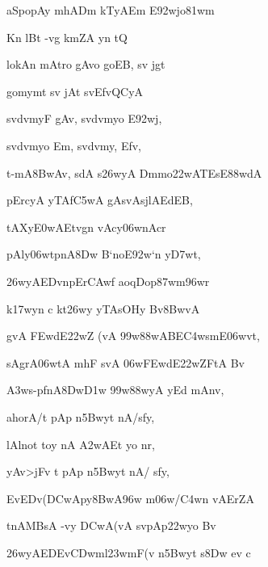 {\dn aSpopAy\2 mhADm{\rdt} kTyAEm E\392wjo\381wm{\dandadn} \dontdisplaylinenum}

{\dn {}K\?n lBt\? -vg{\rdt} km\0ZA y\?n tQ \vegdn\dontdisplaylinenum}

{\dn lokAn\2 mAtro gAvo goEB, sv{\rdt} jgt \dontdisplaylinenum}

{\dn gomymt\2 sv{\rdt} jAt\2 sv\0Efv\?QCyA \vegdn\dontdisplaylinenum}

{\dn sv\0d\?vmyF gAv, sv\0d\?vmyo E\392wj,{\dandabdn} \dontdisplaylinenum}

{\dn sv\0d\?vmyo Em, sv\0d\?vmy, Efv, \vegdn\dontdisplaylinenum}

{\dn t-mA\38BwAv, sdA s\?\326wyA Dm\0mo\322wAT\0EsE\388wdA{\dandabdn} \dontdisplaylinenum}

{\dn pErcyA\0 yTAf\3C5wA g\5AsvAsjlAEdEB, \vegdn\dontdisplaylinenum}

{\dn tAXy\?\3E0wAEtv\?g\?n vAcy\?\306wnAcr\? \dontdisplaylinenum}

{\dn pAly\306wtp\0nA\38Dw\? B`noE\392w`n\? y\3D7wt, \vegdn\dontdisplaylinenum}

{\dn \326wyAEDvnpEr\3CAw\?f aoqDop\387wm\396wr\? \dontdisplaylinenum}

{\dn k\317wyn\2 c kt\0\326wy\2 yTAsOHy\2 Bv\?\38BwvA \vegdn\dontdisplaylinenum}

{\dn gvA\2 \3FEwdE\322wZ\2 (vA \399w\388wABE\3C4wsmE\306wvt,{\dandabdn} \dontdisplaylinenum}

{\dn sAgrA\306wtA mhF svA\0 \306w\3FEwdE\322wZFtA Bv\? \vegdn\dontdisplaylinenum}

{\dn {}\3A3ws\2-pf\0nA\38Dw\3D1w \399w\388wyA yEd mAnv,{\dandabdn} \dontdisplaylinenum}

{\dn ahorA/t\2 pAp\2 n\35Bwyt\? nA/s\2fy, \vegdn\dontdisplaylinenum}

{\dn lAl\?not\2 toy\2 nA\0 \3A2wAEt yo nr,{\dandabdn} \dontdisplaylinenum}

{\dn yAv>jFv t\2 pAp\2 n\35Bwyt\? nA/ s\2fy, \vegdn\dontdisplaylinenum}

{\dn EvEDv(\3DCwApy\?\38BwA\2\396w m\306w/\3C4w\?n vAErZA{\dandabdn} \dontdisplaylinenum}

{\dn t\?nAMBsA -vy\2 \3DCwA(vA sv\0pAp\322wyo Bv\? \vegdn\dontdisplaylinenum}

{\dn \326wyAEDEv\3CDwml\323wmF(v\2 n\35Bwyt\? s\38Dw ev c{\dandabdn} \dontdisplaylinenum}

